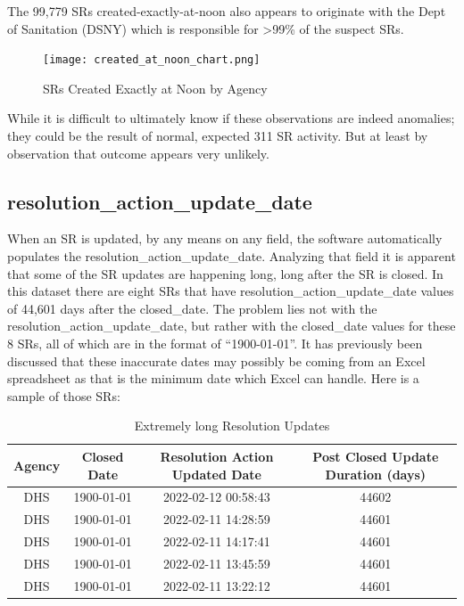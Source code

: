 \documentclass[12pt, titlepage]{article}
\begin{document}
	The 99,779 SRs created-exactly-at-noon also appears to originate with the Dept of Sanitation (DSNY) which
	is responsible for \textgreater{}99\% of the suspect SRs.
	
	\begin{figure}[H]
		 \centering
		 \texttt{[image: created\_at\_noon\_chart.png]}
		 \caption{SRs Created Exactly at Noon by Agency}
		 \label{fig:noon-created}
	\end{figure}		
		
	While it is difficult to ultimately know if these observations are indeed anomalies; they could be the result of normal, expected
	311 SR activity. But at least by observation that outcome appears very unlikely.	
		
	\subsection{resolution\_action\_update\_date}
	When an SR is updated, by any means on any field, the software automatically populates the resolution\_action\_update\_date. Analyzing that field
	it is apparent that some of the SR updates are happening long, long after the SR is closed. In this dataset there are eight SRs that have 
	resolution\_action\_update\_date values of 44,601 days after the closed\_date. The problem lies not with the resolution\_action\_update\_date, but
	rather with the closed\_date values for these 8 SRs, all of which are in the format of ``1900-01-01''. It has previously been discussed that these
	inaccurate dates may possibly be coming from an Excel spreadsheet as that is the minimum date which Excel can handle. Here is a sample
	of those SRs:

\begin{table}[H]
	    \centering
	    \footnotesize
	    \begin{tabular}{cccc}
	        \hline
	        Agency & Closed Date & Resolution Action Updated Date & Post Closed Update Duration (days) \\
	        \hline
	        DHS & 1900-01-01 & 2022-02-12 00:58:43 & 44602 \\
	        DHS & 1900-01-01 & 2022-02-11 14:28:59 & 44601 \\
	        DHS & 1900-01-01 & 2022-02-11 14:17:41 & 44601 \\
	        DHS & 1900-01-01 & 2022-02-11 13:45:59 & 44601 \\
	        DHS & 1900-01-01 & 2022-02-11 13:22:12 & 44601 \\
	        \hline
	    \end{tabular}
	    \caption{Extremely long Resolution Updates}
	    \label{tab:resolution-updates}
	\end{table}
	
\end{document}
